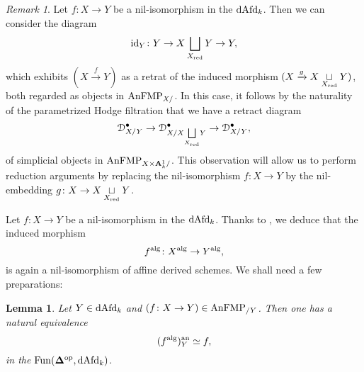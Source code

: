 \documentclass[10pt,a4paper,reqno]{amsart} %
\theoremstyle{plain}
\newtheorem{lem}[thm]{Lemma}
\theoremstyle{definition}
\theoremstyle{remark}
\newtheorem{rem}[thm]{Remark}
\numberwithin{equation}{section}
\begin{document}
\begin{rem}
    Let $f\colon X \to Y$ be a nil-isomorphism in the \infcat $\mathrm{dAfd}_k$. Then we can consider the diagram
        \[
            \mathrm{id}_Y \colon Y \to X \bigsqcup_{X_{\mathrm{red}}} Y \to Y,  
        \]
    which exhibits $(X \xrightarrow{f} Y)$ as a retrat of the induced morphism $(X \xrightarrow{g} X \underset{X_{\mathrm{red}}}{\sqcup}Y)$, both regarded as objects in $\mathrm{AnFMP}_{X/ }$.
    In this case, it follows by the naturality of the parametrized Hodge filtration that we have a retract diagram
        \[
            \mathcal D^\bullet_{X/ Y} \to \mathcal D^\bullet_{X/ X \underset{X_{\mathrm{red}}}{\bigsqcup} Y} \to \mathcal D^\bullet_{X/ Y},   
        \]
    of simplicial objects in $\mathrm{AnFMP}_{X \times \mathbf A^1_k/ }$. This observation will allow us to perform reduction arguments by replacing the nil-isomorphism
    $f\colon X \to Y$ by the nil-embedding $g \colon X \to X \underset{X_{\mathrm{red}}}{\sqcup} Y$.
\end{rem}

Let $f \colon X \to Y$ be a nil-isomorphism in the \infcat $\mathrm{dAfd}_k$.
Thanks to \cite[Lemma 6.9.]{Porta_Yu_NQK}, we deduce that the induced morphism
    \[
        f^\mathrm{alg} \colon X^\mathrm{alg} \to Y^\mathrm{alg},  
    \]
is again a nil-isomorphism of affine derived schemes. We shall need a few preparations:

\begin{lem} \label{lem:relative_anlaytification_of_closed_immersions_are_compatible_with_alg_construction} Let $Y \in \mathrm{dAfd}_k$ and
    $(f \colon X \to Y) \in \mathrm{AnFMP}_{/Y}$. Then one has a natural equivalence
        \[
            (f ^\mathrm{alg})^\mathrm{an}_Y \simeq f,  
        \]
    in the \infcat $\operatorname{Fun}(\bm{\Delta}^\mathrm{op}, \mathrm{dAfd}_k)$.
\end{lem}
\end{document}
